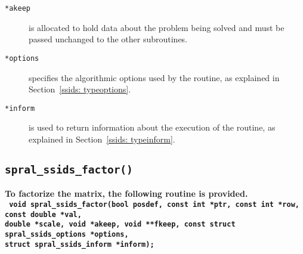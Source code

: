 \begin{description}
\item[\texttt{*akeep}] is allocated to hold data about the problem being
   solved and must be passed unchanged to the other subroutines.

\item[\texttt{*options}] specifies the algorithmic options used by the
   routine, as explained in Section~\ref{ssids: typeoptions}.

\item[\texttt{*inform}] is used to return information about the execution
   of the routine, as explained in Section~\ref{ssids: typeinform}.

\end{description}


\subsection{\texttt{spral\_ssids\_factor()}} \label{ssids: factorize}
\textbf{To factorize the matrix, the following routine is provided.
   \vspace*{0.1cm} \\
   \texttt{
      \hspace*{0.2cm} void spral\_ssids\_factor(bool posdef, const int *ptr, const int *row, const double *val, \\
      \hspace*{0.7cm} double *scale, void *akeep, void **fkeep,
         const struct spral\_ssids\_options *options, \\
      \hspace*{0.7cm} struct spral\_ssids\_inform *inform);
   }
}

